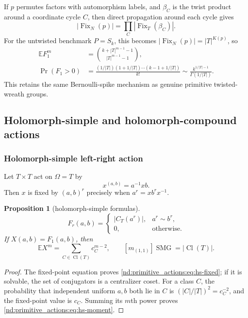 \documentclass[10pt]{article}
\newcommand{\Fix}{\operatorname{Fix}}
\newcommand{\SMG}{\operatorname{SMG}}
\newcommand{\MGF}{\SMG}
\newcommand{\E}{\mathbb E}
\newcommand{\Cl}{\operatorname{Cl}}
\newtheorem{proposition}{Proposition}
\begin{document}
If $p$ permutes factors with automorphism labels, and $\beta_C$ is the twist
product around a coordinate cycle $C$, then direct propagation around each
cycle gives
\begin{equation}\label{nd:primitive_actions:eq:twisted-cycle}
 \boxed{|\Fix_N(p)|=\prod_C|\Fix_T(\beta_C)|.}
\end{equation}
For the untwisted benchmark $P=S_k$, this becomes
$|\Fix_N(p)|=|T|^{K(p)}$, so
\begin{align}
 \E F_1^m
 &=\binom{k+|T|^{m-1}-1}{|T|^{m-1}-1},\label{nd:primitive_actions:eq:twisted-benchmark-moment}\\
 \Pr(F_1>0)
 &=\frac{(1/|T|)(1+1/|T|)\cdots(k-1+1/|T|)}{k!}
 \sim\frac{k^{1/|T|-1}}{\Gamma(1/|T|)}.
 \label{nd:primitive_actions:eq:twisted-benchmark-survival}
\end{align}
This retains the same Bernoulli-spike mechanism as genuine primitive
twisted-wreath groups.

\subsection{Holomorph-simple and holomorph-compound actions}

\subsubsection{Holomorph-simple left-right action}

Let $T\times T$ act on $\Omega=T$ by
\[
 x^{(a,b)}=a^{-1}xb.
\]
Then $x$ is fixed by $(a,b)^r$ precisely when $a^r=xb^rx^{-1}$.

\begin{proposition}[holomorph-simple formulas]\label{nd:primitive_actions:prop:hs}
\begin{equation}\label{nd:primitive_actions:eq:hs-fixed}
 \boxed{F_r(a,b)=
 \begin{cases}|C_T(a^r)|,&a^r\sim b^r,\\0,&\text{otherwise}.
 \end{cases}}
\end{equation}
If $X(a,b)=F_1(a,b)$, then
\begin{equation}\label{nd:primitive_actions:eq:hs-moment}
 \boxed{\E X^m=\sum_{C\in\Cl(T)}c_C^{m-2},
 \qquad [m_{(1,1)}]\MGF=|\Cl(T)|.}
\end{equation}
\end{proposition}

\begin{proof}
The fixed-point equation proves \eqref{nd:primitive_actions:eq:hs-fixed}; if it is solvable, the
set of conjugators is a centralizer coset.  For a class $C$, the probability
that independent uniform $a,b$ both lie in $C$ is
$(|C|/|T|)^2=c_C^{-2}$, and the fixed-point value is $c_C$.  Summing its
$m$th power proves \eqref{nd:primitive_actions:eq:hs-moment}.
\end{proof}
\end{document}
